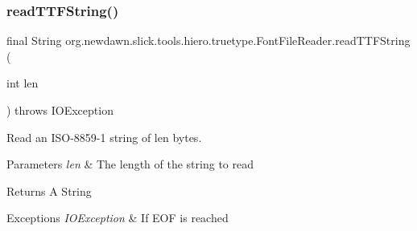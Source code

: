 \subsubsection{\texorpdfstring{read\+T\+T\+F\+String()}{readTTFString()}\hspace{0.1cm}{\footnotesize\ttfamily [2/2]}}
{\footnotesize\ttfamily final String org.\+newdawn.\+slick.\+tools.\+hiero.\+truetype.\+Font\+File\+Reader.\+read\+T\+T\+F\+String (\begin{DoxyParamCaption}\item[{int}]{len }\end{DoxyParamCaption}) throws I\+O\+Exception\hspace{0.3cm}{\ttfamily [inline]}}

Read an I\+S\+O-\/8859-\/1 string of len bytes.


\begin{DoxyParams}{Parameters}
{\em len} & The length of the string to read \\
\hline
\end{DoxyParams}
\begin{DoxyReturn}{Returns}
A String 
\end{DoxyReturn}

\begin{DoxyExceptions}{Exceptions}
{\em I\+O\+Exception} & If E\+OF is reached \\
\hline
\end{DoxyExceptions}


